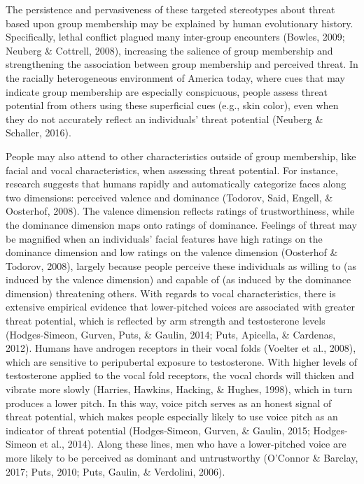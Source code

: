\documentclass[
  english,
  man, noextraspace,floatsintext]{apa6}
\begin{document}
The persistence and pervasiveness of these targeted stereotypes about threat based upon group membership may be explained by human evolutionary history. Specifically, lethal conflict plagued many inter-group encounters (Bowles, 2009; Neuberg \& Cottrell, 2008), increasing the salience of group membership and strengthening the association between group membership and perceived threat. In the racially heterogeneous environment of America today, where cues that may indicate group membership are especially conspicuous, people assess threat potential from others using these superficial cues (e.g., skin color), even when they do not accurately reflect an individuals' threat potential (Neuberg \& Schaller, 2016).

People may also attend to other characteristics outside of group membership, like facial and vocal characteristics, when assessing threat potential. For instance, research suggests that humans rapidly and automatically categorize faces along two dimensions: perceived valence and dominance (Todorov, Said, Engell, \& Oosterhof, 2008). The valence dimension reflects ratings of trustworthiness, while the dominance dimension maps onto ratings of dominance. Feelings of threat may be magnified when an individuals' facial features have high ratings on the dominance dimension and low ratings on the valence dimension (Oosterhof \& Todorov, 2008), largely because people perceive these individuals as willing to (as induced by the valence dimension) and capable of (as induced by the dominance dimension) threatening others. With regards to vocal characteristics, there is extensive empirical evidence that lower-pitched voices are associated with greater threat potential, which is reflected by arm strength and testosterone levels (Hodges-Simeon, Gurven, Puts, \& Gaulin, 2014; Puts, Apicella, \& Cardenas, 2012). Humans have androgen receptors in their vocal folds (Voelter et al., 2008), which are sensitive to peripubertal exposure to testosterone. With higher levels of testosterone applied to the vocal fold receptors, the vocal chords will thicken and vibrate more slowly (Harries, Hawkins, Hacking, \& Hughes, 1998), which in turn produces a lower pitch. In this way, voice pitch serves as an honest signal of threat potential, which makes people especially likely to use voice pitch as an indicator of threat potential (Hodges-Simeon, Gurven, \& Gaulin, 2015; Hodges-Simeon et al., 2014). Along these lines, men who have a lower-pitched voice are more likely to be perceived as dominant and untrustworthy (O'Connor \& Barclay, 2017; Puts, 2010; Puts, Gaulin, \& Verdolini, 2006).
\end{document}
